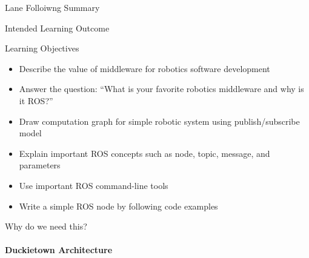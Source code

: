 \documentclass[aspectratio=43]{beamer}
\begin{document}
\begin{frame}{Lane Folloiwng Summary}
	\begin{center}
	\end{center}
\end{frame}

\begin{frame}{Intended Learning Outcome}
	\begin{block}{Learning Objectives}
		\begin{itemize}
			\item<0> Describe the value of middleware for robotics software development
			\item<0> Answer the question: ``What is your favorite robotics middleware and why is it ROS?''
			\item<1> Draw computation graph for simple robotic system using publish/subscribe model
			\item<0> Explain important ROS concepts such as node, topic, message, and parameters
			\item<0> Use important ROS command-line tools
			\item<0> Write a simple ROS node by following code examples
		\end{itemize}
	\end{block}
\end{frame}
 
\begin{frame}{Why do we need this?}
\framesubtitle{Duckietown Architecture}
\begin{center}
\end{center}
\end{frame}
\end{document}
